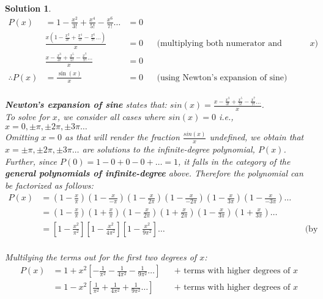 \documentclass{article}
\newtheorem*{solution*}{Solution}
\begin{document}
\begin{solution*}
    \begin{align*}
        P(x) &= 1-\frac{x^2}{3!}+\frac{x^4}{5!}-\frac{x^6}{7!}\dots &= 0\\
        & \frac{x(1-\frac{x^2}{3!}+\frac{x^4}{5!}-\frac{x^6}{7!}\dots)}{x} &= 0
        && \text{(multiplying both numerator and denominator by } x)\\
        & \frac{x-\frac{x^3}{3!}+\frac{x^5}{5!}-\frac{x^7}{7!}\dots}{x} &= 0\\
        \therefore P(x) &= \frac{\sin(x)}{x} &= 0
        && \text{(using Newton's expansion of sine)}\\
    \end{align*}

    \textbf{Newton's expansion of sine} states that:
    $sin(x) = \frac{x-\frac{x^3}{3!}+\frac{x^5}{5!}-\frac{x^7}{7!}\dots}{x}$.\\
    
    To solve for $x$, we consider all cases where $sin(x)=0$
    i.e., $x=0, \pm\pi, \pm2\pi, \pm3\pi\dots$\\

    Omitting $x=0$ as that will render the fraction 
    $\frac{sin(x)}{x}$ undefined, we obtain that $x=\pm\pi, \pm2\pi, \pm3\pi\dots$
    are solutions to the infinite-degree polynomial, $P(x)$.\\

    Further, since $P(0)=1-0+0-0+\dots=1$, 
    it falls in the category of the \textbf{general polynomials of infinite-degree} above.
    Therefore the polynomial can be factorized as follows:\\

    \begin{align*}
        P(x) &= (1-\frac{x}{\pi})(1-\frac{x}{-\pi})
        (1-\frac{x}{2\pi})(1-\frac{x}{-2\pi})
        (1-\frac{x}{3\pi})(1-\frac{x}{-3\pi})\dots\\
        &= (1-\frac{x}{\pi})(1+\frac{x}{\pi})
        (1-\frac{x}{2\pi})(1+\frac{x}{2\pi})
        (1-\frac{x}{3\pi})(1+\frac{x}{3\pi})\dots\\
        &= [1-\frac{x^2}{\pi^2}]
        [1-\frac{x^2}{4\pi^2}]
        [1-\frac{x^2}{9\pi^2}]\dots
        &&\text{(by multilying the terms in pairs)}\\
    \end{align*}    

    Multilying the terms out for the first two degrees of $x$:\\

    \begin{align*}        
        P(x) &= 1 + x^2 [
            -\frac{1}{\pi^2}
            -\frac{1}{4\pi^2}
            -\frac{1}{9\pi^2}\dots]
        &&\text{+ terms with higher degrees of $x$}\\
        &= 1 - x^2 [
            \frac{1}{\pi^2}
            +\frac{1}{4\pi^2}
            +\frac{1}{9\pi^2}\dots]
        &&\text{+ terms with higher degrees of $x$}\\
    \end{align*}
    

\end{solution*}
\end{document}
